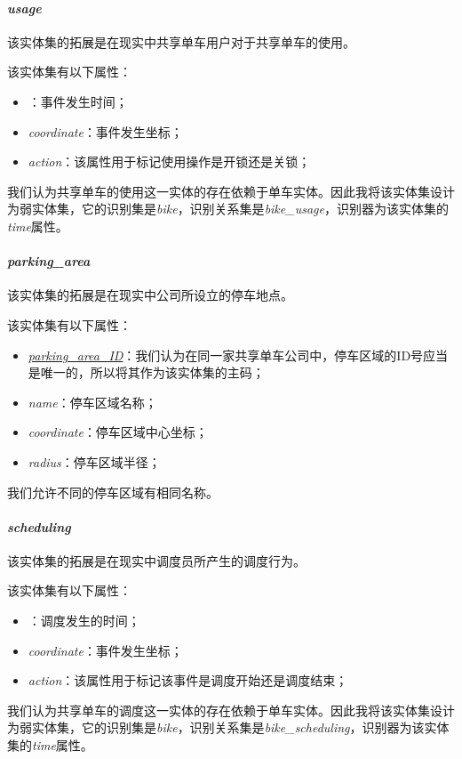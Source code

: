 \paragraph{\textit{usage}}

该实体集的拓展是在现实中共享单车用户对于共享单车的使用。

该实体集有以下属性：
\begin{itemize}
  \item \textit{}：事件发生时间；
  \item \textit{coordinate}：事件发生坐标；
  \item \textit{action}：该属性用于标记使用操作是开锁还是关锁；
\end{itemize}

我们认为共享单车的使用这一实体的存在依赖于单车实体。因此我将该实体集设计为弱实体集，它的识别集是\textit{bike}，识别关系集是\textit{bike\_usage}，识别器为该实体集的\textit{time}属性。

\paragraph{\textit{parking\_area}}

该实体集的拓展是在现实中公司所设立的停车地点。

该实体集有以下属性：
\begin{itemize}
  \item \textit{\underline{parking\_area\_ID}}：我们认为在同一家共享单车公司中，停车区域的ID号应当是唯一的，所以将其作为该实体集的主码；
  \item \textit{name}：停车区域名称；
  \item \textit{coordinate}：停车区域中心坐标；
  \item \textit{radius}：停车区域半径；
\end{itemize}

我们允许不同的停车区域有相同名称。
\paragraph{\textit{scheduling}}
该实体集的拓展是在现实中调度员所产生的调度行为。

该实体集有以下属性：
\begin{itemize}
  \item \textit{}：调度发生的时间；
  \item \textit{coordinate}：事件发生坐标；
  \item \textit{action}：该属性用于标记该事件是调度开始还是调度结束；
\end{itemize}
我们认为共享单车的调度这一实体的存在依赖于单车实体。因此我将该实体集设计为弱实体集，它的识别集是\textit{bike}，识别关系集是\textit{bike\_scheduling}，识别器为该实体集的\textit{time}属性。

